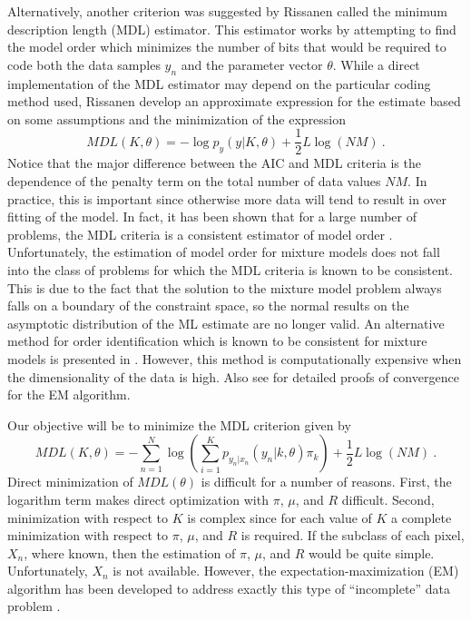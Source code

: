\documentclass[12pt]{article}
\begin{document}
Alternatively, another criterion was suggested by Rissanen \cite{Ri83}
called the minimum description length (MDL) estimator.
This estimator works by attempting to find the model order
which minimizes the number of bits that would be required to code
both the data samples $y_n$ and the parameter vector $\theta$.
While a direct implementation of the MDL estimator may depend on the
particular coding method used, Rissanen develop an approximate expression
for the estimate based on some assumptions and the minimization
of the expression
$$
MDL(K,\theta) = -\log p_y( y |K,\theta ) +\frac{1}{2} L \log (NM) \ .
$$
Notice that the major difference between the AIC and MDL criteria
is the dependence of the penalty term on the 
total number of data values $NM$. 
In practice, this is important since otherwise more data will tend to result
in over fitting of the model.
In fact, it has been shown that for a large number
of problems, the MDL criteria is a consistent estimator of model order \cite{Ka82,WaKa85}.
Unfortunately, the estimation of model order for mixture models
does not fall into the class of problems for which the MDL criteria
is known to be consistent.
This is due to the fact that the solution to the mixture model problem
always falls on a boundary of the constraint space,
so the normal results on the asymptotic distribution of the ML estimate
are no longer valid.
An alternative method for order identification which is known to be consistent
for mixture models is presented in \cite{AiRu84}.
However, this method is  computationally expensive  
when the dimensionality of the data is high.
Also see \cite{ReWa84} for detailed proofs of convergence
for the EM algorithm.

Our objective will be to minimize the MDL criterion
given by
\begin{equation}
MDL(K,\theta) = -\sum_{n=1}^N \log \left( \sum_{i=1}^K
p_{y_n|x_n}(y_n | k,\theta) \pi_k \right)
+\frac{1}{2} L \log (NM)  \ .
\label{eq:MDL}
\end{equation}
Direct minimization of $MDL(\theta)$ is difficult for a number
of reasons.
First, the logarithm term makes direct optimization with
$\pi$, $\mu$, and $R$ difficult.
Second, minimization with respect to $K$ is complex since
for each value of $K$ a complete minimization with respect
to $\pi$, $\mu$, and $R$ is required.
If the subclass of each pixel, $X_n$, where known, then the estimation
of $\pi$, $\mu$, and $R$ would be quite simple.
Unfortunately, $X_n$ is not available. 
However, the expectation-maximization (EM) algorithm has been developed
to address exactly this type 
of ``incomplete'' data problem \cite{BaPeSoWe70,DeLaRu77}.
\end{document}
